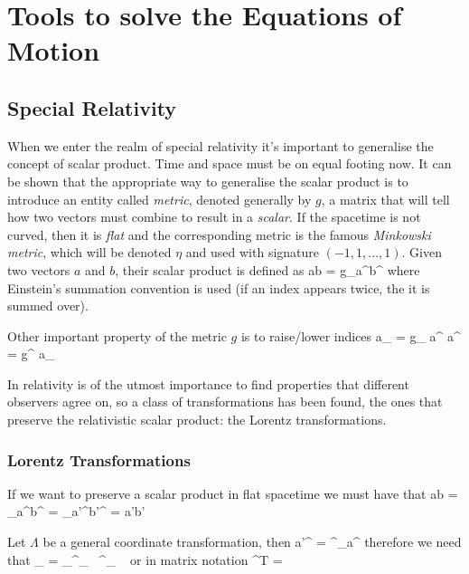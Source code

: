 \documentclass[oneside, 12pt]{book}
\begin{document}
\pagestyle{mypage2} \normalfont

\chapter{Tools to solve the Equations of Motion}

\section{Special Relativity}

When we enter the realm of special relativity it's important to generalise the concept of scalar product. Time and space must be on equal footing now. It can be shown that the appropriate way to generalise the scalar product is to introduce an entity called \textit{metric}, denoted generally by \(g\), a matrix that will tell how two vectors must combine to result in a \textit{scalar}. If the spacetime is not curved, then it is \textit{flat} and the corresponding metric is the famous \textit{Minkowski metric}, which will be denoted \(\eta\) and used with signature \((-1,1,...,1)\). Given two vectors \(a\) and \(b\), their scalar product is defined as
\beq[] a\cdot b = g_{\mu\nu}a^{\mu}b^{\nu} \eeq
where Einstein's summation convention is used (if an index appears twice, the it is summed over).\par

Other important property of the metric \(g\) is to raise/lower indices
\beq[] a_{\mu} = g_{\mu \nu} a^{\nu} \eeq
\beq[] a^{\mu} = g^{\mu \nu} a_{\nu}  \eeq

In relativity is of the utmost importance to find properties that different observers agree on, so a class of transformations has been found, the ones that preserve the relativistic scalar product: the Lorentz transformations.\par

\subsection{Lorentz Transformations}

If we want to preserve a scalar product in flat spacetime we must have that
\beq[] a\cdot b = \eta_{\mu \nu}a^{\mu}b^{\nu}  = \eta_{\mu \nu}a'^{\mu}b'^{\nu} = a'\cdot b' \eeq\par

Let \(\Lambda \) be a general coordinate transformation, then
\beq[] a'^{\mu} = \Lambda^{\mu}_{\nu}a^{\nu}\eeq
therefore we need that
\beq[] \eta_{\mu \nu} = \eta_{\rho \sigma}\Lambda^{\sigma}_ {\ \mu}\Lambda^{\rho}_ {\ \nu}\eeq
or in matrix notation
\beq[] \Lambda^{T} \eta \Lambda = \eta\eeq\par
\end{document}

